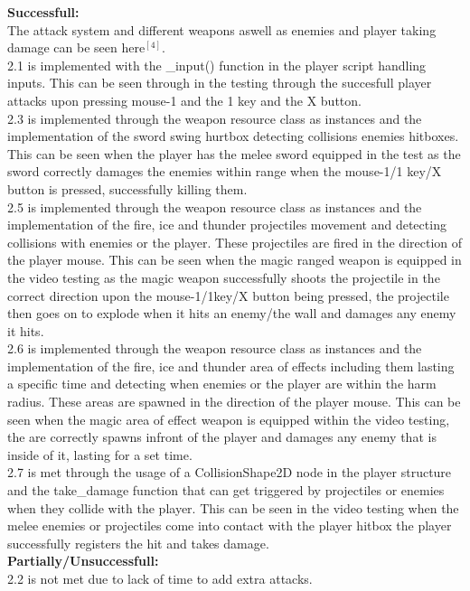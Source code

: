 \documentclass{article}
\begin{document}
        \textbf{Successfull:}\\
        The attack system and different weapons aswell as enemies and player taking damage can be seen here$^{[4]}$.\\
        2.1 is implemented with the \_input() function in the player script handling inputs. This can be seen through in the testing through the succesfull player attacks upon pressing mouse-1 and the 1 key and the X button.\\
        2.3 is implemented through the weapon resource class as instances and the implementation of the sword swing hurtbox detecting collisions enemies hitboxes. This can be seen when the player has the melee sword equipped in the test as the sword correctly damages the enemies within range when the mouse-1/1 key/X button is pressed, successfully killing them.\\
        2.5 is implemented through the weapon resource class as instances and the implementation of the fire, ice and thunder projectiles movement and detecting collisions with enemies or the player. These projectiles are fired in the direction of the player mouse. This can be seen when the magic ranged weapon is equipped in the video testing as the magic weapon successfully shoots the projectile in the correct direction upon the mouse-1/1key/X button being pressed, the projectile then goes on to explode when it hits an enemy/the wall and damages any enemy it hits.\\
        2.6 is implemented through the weapon resource class as instances and the implementation of the fire, ice and thunder area of effects including them lasting a specific time and detecting when enemies or the player are within the harm radius. These areas are spawned in the direction of the player mouse. This can be seen when the magic area of effect weapon is equipped within the video testing, the are correctly spawns infront of the player and damages any enemy that is inside of it, lasting for a set time.\\
        2.7 is met through the usage of a CollisionShape2D node in the player structure and the take\_damage function that can get triggered by projectiles or enemies when they collide with the player. This can be seen in the video testing when the melee enemies or projectiles come into contact with the player hitbox the player successfully registers the hit and takes damage.\\
        \textbf{Partially/Unsuccessfull:}\\
        2.2 is not met due to lack of time to add extra attacks.
\end{document}

